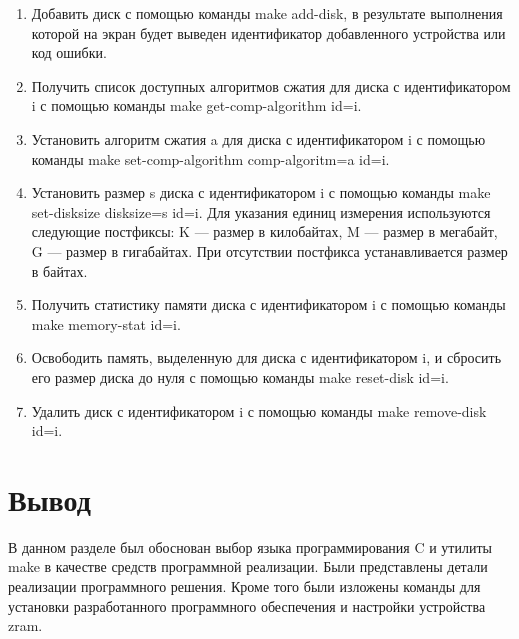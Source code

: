 \begin{enumerate}
    \item Добавить диск с помощью команды make add-disk, в результате выполнения которой на экран будет выведен идентификатор добавленного устройства или код ошибки.
    \item Получить список доступных алгоритмов сжатия для диска с идентификатором i с помощью команды make get-comp-algorithm id=i.
    \item Установить алгоритм сжатия a для диска с идентификатором i с помощью команды make set-comp-algorithm comp-algoritm=a id=i.
    \item Установить размер s диска с идентификатором i с помощью команды make set-disksize disksize=s id=i. Для указания единиц измерения используются следующие постфиксы: K --- размер в килобайтах, M --- размер в мегабайт, G --- размер в гигабайтах. При отсутствии постфикса устанавливается размер в байтах.
    \item Получить статистику памяти диска с идентификатором i с помощью команды make memory-stat id=i.
    \item Освободить память, выделенную для диска с идентификатором i, и сбросить его размер диска до нуля с помощью команды make reset-disk id=i.
    \item Удалить диск с идентификатором i с помощью команды make remove-disk id=i.
\end{enumerate}

\section*{Вывод}

В данном разделе был обоснован выбор языка программирования C и утилиты make в качестве средств программной реализации. Были представлены детали реализации программного решения. Кроме того были изложены команды для установки разработанного программного обеспечения и настройки устройства zram.
